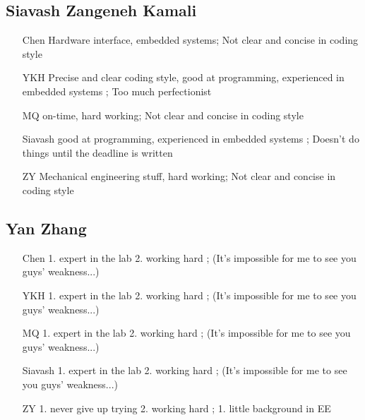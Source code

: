 \documentclass[a4paper]{article}
\begin{document}
\subsection{Siavash Zangeneh Kamali}
\begin{itemize}
\item[Chen] Hardware interface, embedded systems; Not clear and concise in coding style
\item[YKH] Precise and clear coding style, good at programming, experienced in embedded systems ; Too much perfectionist
\item[MQ] on-time, hard working; Not clear and concise in coding style
\item[Siavash] good at programming, experienced in embedded systems ; Doesn't do things until the deadline is written
\item[ZY] Mechanical engineering stuff, hard working; Not clear and concise in coding style
\end{itemize}

\subsection{Yan Zhang}
\begin{itemize}
\item[Chen] 1. expert in the lab 2. working hard	;	(It's impossible for me to see you guys' weakness...)
\item[YKH]	1. expert in the lab 2. working hard	;	(It's impossible for me to see you guys' weakness...)
\item[MQ]	1. expert in the lab 2. working hard	;	(It's impossible for me to see you guys' weakness...)
\item[Siavash]	1. expert in the lab 2. working hard	;	(It's impossible for me to see you guys' weakness...)
\item[ZY]	1. never give up trying 2. working hard	;	1. little background in EE
\end{itemize}
\end{document}
